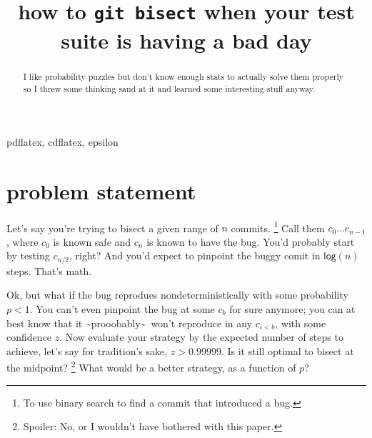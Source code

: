 \documentclass[11pt]{sigplanconf}
\begin{document}
\copyrightdata{}

\title{
how to \texttt{git bisect} when your test suite is having a bad day
}


\maketitle

\begin{abstract}
	I like probability puzzles but don't know enough stats to actually solve them properly
	so I threw some thinking sand at it and learned some interesting stuff anyway.
\end{abstract}


\keywords pdflatex, cdflatex, epsilon

\newcommand\confidents{\ensuremath{z}\xspace}
\newcommand\pdf{\ensuremath{\mathsf{pdf}}\xspace}
\newcommand\cdf{\ensuremath{\mathsf{cdf}}\xspace}

\section{problem statement}

Let's say you're trying to bisect
a given range of $n$ commits.%
\footnote{To use binary search to find a commit that introduced a bug.}
Call them $c_0 \dots c_{n-1}$, where $c_0$ is known safe and $c_n$ is known to have the bug.
You'd probably start by testing $c_{n/2}$, right?
And you'd expect to pinpoint the buggy comit in $\mathsf{log} (n)$ steps.
That's math.

Ok, but what if the bug reprodues nondeterministically with some probability $p<1$.
You can't even pinpoint the bug at some $c_{b}$ for sure anymore;
you can at best know
that it \textasciitilde{}prooobably\textasciitilde~won't reproduce in any $c_{i<b}$,
with some confidence $\confidents$.
Now evaluate your strategy by the expected number of steps to achieve, let's say for tradition's sake, $\confidents > 0.99999$.
Is it still optimal to bisect at the midpoint?%
\footnote{Spoiler: No, or I wouldn't have bothered with this paper.}
What would be a better strategy, as a function of $p$?
\end{document}
